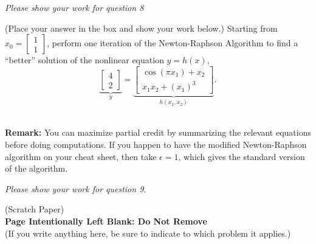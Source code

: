 \documentclass[letterpaper]{article}
\begin{document}
\newpage
\textit{Please show your work for question 8}

\newpage

(Place your answer in the box and show your work below.)  Starting from  $x_0= \left[ \begin{array}{c} 1\\ 1\end{array} \right]$, perform one iteration of the Newton-Raphson Algorithm to find a ``better'' solution of the nonlinear equation $y=h(x)$,
$$\underbrace{\left[ \begin{array}{c} 4\\ 2\end{array} \right]}_{y} = \underbrace{\left[ \begin{array}{c} \cos(\pi x_1) + x_2\\ x_1 x_2+(x_1)^3 \end{array} \right]}_{h(x_1,x_2)}.$$

\\

\noindent \textbf{Remark:} You can maximize partial credit by summarizing the relevant equations before doing computations. If you happen to have the modified Newton-Raphson algorithm on your cheat sheet, then take $\epsilon=1$, which gives the standard version of the algorithm. \\

\newpage

\newpage
\textit{Please show your work for question 9.}

\newpage
\vspace*{2cm}

\begin{center}
(Scratch Paper)\\
{\bf \LARGE Page Intentionally Left Blank: Do Not Remove}\\
(If you write anything here, be sure to indicate to which problem it applies.)

\end{center}


\end{document}
